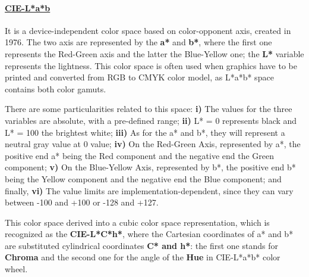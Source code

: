 \paragraph{\underline{CIE-L*a*b}} It is a device-independent color space based on color-opponent axis,
created in 1976. The two axis are represented by the \textbf{a*} and \textbf{b*}, where the first one represents the
Red-Green axis and the latter the Blue-Yellow one; the \textbf{L*} variable represents the lightness. This
color space is often used when graphics have to be printed and converted from RGB to CMYK color model, as
L*a*b* space contains both color gamuts. \par
There are some particularities related to this space: \textbf{i)} The values for the
three variables are absolute, with a pre-defined range; \textbf{ii)} L* = 0 represents black and L* = 100 the brightest white;
\textbf{iii)} As for the a* and b*, they will represent a neutral gray value at 0 value; \textbf{iv)} On the Red-Green Axis,
represented by a*, the positive end a* being the Red component and the negative end the Green component; \textbf{v)}
On the Blue-Yellow Axis, represented by b*, the positive end b* being the Yellow component and the negative end the Blue component;
 and finally, \textbf{vi)} The value limits are implementation-dependent, since they can vary between -100 and +100 or -128 and +127. \par
This color space derived into a cubic color space representation, which is recognized as the
\textbf{CIE-L*C*h*}, where the Cartesian coordinates of a* and b* are substituted cylindrical coordinates
\textbf{C* and h*}: the first one stands for \textbf{Chroma} and the second one for the angle of the
\textbf{Hue} in CIE-L*a*b* color wheel. \par
%
